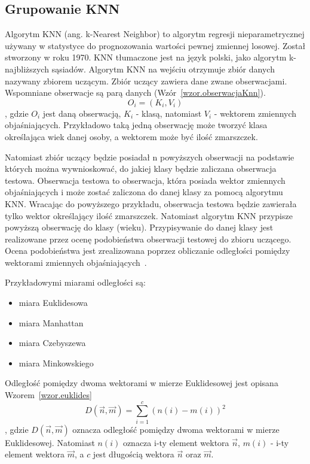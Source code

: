\documentclass[a4paper,twoside,12pt]{book}
\begin{document}
    \subsection{Grupowanie KNN}\label{subsec:grupowanie-knn}
    Algorytm KNN (ang. k-Nearest Neighbor) to algorytm regresji
    nieparametrycznej używany w statystyce do
    prognozowania wartości pewnej zmiennej losowej. Został stworzony w roku 1970.
    KNN tłumaczone jest na język polski, jako algorytm k- najbliższych sąsiadów.
    Algorytm KNN na wejściu otrzymuje zbiór danych nazywany zbiorem uczącym.
    Zbiór uczący zawiera dane zwane obserwacjami. Wspomniane obserwacje są parą danych (Wzór~\ref{wzor.obserwacjaKnn}).
    \large
    \begin{equation}
        O_{i} = (K_{i}, V_{i})
        \label{wzor.obserwacjaKnn}
    \end{equation}
    \normalsize
    , gdzie $O_{i}$ jest daną obserwacją, $K_{i}$ - klasą, natomiast $V_{i}$ - wektorem zmiennych objaśniających.
    Przykładowo taką jedną obserwację może tworzyć klasa określająca wiek danej osoby, a wektorem może być ilość
    zmarszczek.

    Natomiast zbiór uczący będzie posiadał n powyższych obserwacji na podstawie których można wywnioskować, do jakiej
    klasy będzie zaliczana obserwacja testowa. Obserwacja testowa to obserwacja, która posiada wektor zmiennych
    objaśniających i może zostać zaliczona do danej klasy za pomocą algorytmu KNN.
    Wracając do powyższego przykładu, obserwacja testowa będzie zawierała tylko wektor określający ilość zmarszczek.
    Natomiast algorytm KNN przypisze powyższą obserwację do klasy (wieku).
    Przypisywanie do danej klasy jest realizowane przez ocenę podobieństwa obserwacji testowej do zbioru uczącego.
    Ocena podobieństwa jest zrealizowana poprzez obliczanie odległości pomiędzy wektorami zmiennych
    objaśniających~\cite{knnOpis}.

    Przykładowymi miarami odległości są:
    \begin{itemize}
        \item miara Euklidesowa
        \item miara Manhattan
        \item miara Czebyszewa
        \item miara Minkowskiego
    \end{itemize}
    Odległość pomiędzy dwoma wektorami w mierze Euklidesowej jest opisana Wzorem~\ref{wzor.euklides}
    \large
    \begin{equation}
        D(\overrightarrow{n},\overrightarrow{m})=\sum_{i=1}^{c}(n(i)-m(i))^{2}
        \label{wzor.euklides}
    \end{equation}
    \normalsize
    , gdzie $D(\overrightarrow{n},\overrightarrow{m})$ oznacza odległość pomiędzy dwoma wektorami w mierze Euklidesowej.
    Natomiast $n(i)$ oznacza i-ty element wektora $\overrightarrow{n}$,  $m(i)$ - i-ty element wektora
    $\overrightarrow{m}$, a $c$ jest długością wektora  $\overrightarrow{n}$ oraz $\overrightarrow{m}$.
\end{document}
